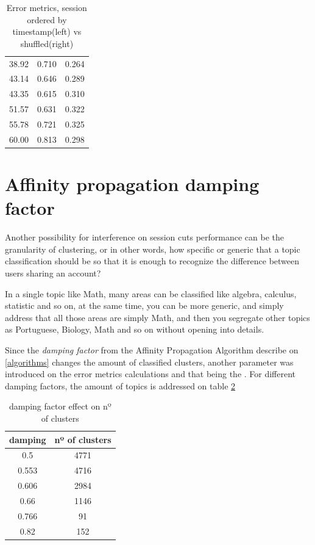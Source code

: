 \documentclass[ecp,tc,english]{iiufrgs}
\begin{document}
\begin{table}[ht!]
{\begin{tabular}{ |c|c|c| }
                38.92 & 0.710 & 0.264 \\
                43.14 & 0.646 & 0.289 \\
                43.35 & 0.615 & 0.310 \\
                51.57 & 0.631 & 0.322 \\
                55.78 & 0.721 & 0.325 \\
                60.00 & 0.813 & 0.298 \\
                \hline
            \end{tabular}
        }
        \caption{Error metrics, session ordered by timestamp(left) vs shuffled(right)}
        \label{tab:cutoff_timestamp_ordered_shuffled}
        \end{table}
    
    \newpage
    \section{Affinity propagation damping factor} \label{affinity_propagation_results}
        Another possibility for interference on session cuts performance can be the granularity of clustering, or in other words, how specific or generic that a topic classification should be so that it is enough to recognize the difference between users sharing an account? 
        
        In a single topic like Math, many areas can be classified like algebra, calculus, statistic and so on, at the same time, you can be more generic, and simply address that all those areas are simply Math, and then you segregate other topics as Portuguese, Biology, Math and so on without opening into details.
        
        Since the \textit{damping factor} from the Affinity Propagation Algorithm describe on \ref{algorithms} changes the amount of classified clusters, another parameter was introduced on the error metrics calculations and that being the . For different damping factors, the amount of topics is addressed on table \ref{tab:damping_factor}
        
        \begin{table}[H]
            \centering
                \begin{tabular}{ |c|c| } 
                \hline
                damping & nº of clusters \\
                \hline 
                0.5 & 4771 \\ 
                0.553 & 4716 \\ 
                0.606 & 2984 \\
                0.66 & 1146 \\
                0.766 & 91 \\
                0.82 & 152 \\
                \hline
                \end{tabular}
            \caption{damping factor effect on nº of clusters}
            \label{tab:damping_factor}
        \end{table}
        
\end{document}
